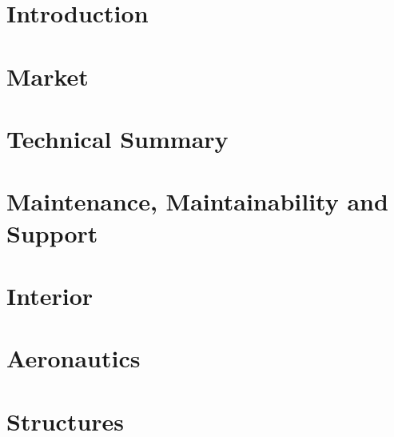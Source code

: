 \documentclass[12pt]{article} %
\numberwithin{figure}{section}
\numberwithin{table}{section}
\begin{document}

\listoftables

\newpage %

\renewcommand*{\thepage}{\arabic{section}-\arabic{page}}

\newpage
\setcounter{page}{1}
\section{Introduction}
    

\newpage
\setcounter{page}{1}
\section{Market}
    

\newpage    
\setcounter{page}{1}
\section{Technical Summary}
    

\newpage
\setcounter{page}{1}
\section{Maintenance, Maintainability and Support}
    

\newpage
\setcounter{page}{1}
\section{Interior}
    

\newpage
\setcounter{page}{1}
\section{Aeronautics}
    

\newpage
\setcounter{page}{1}
\section{Structures}
    
\end{document}
